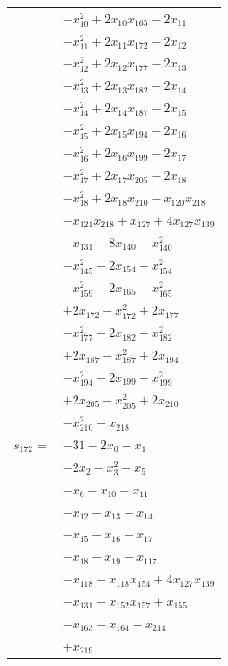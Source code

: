 \begin{longtable}{@{}r@{\;}l@{}}
 & \(\displaystyle -x_{10}^{2} +2x_{10}x_{165} -2x_{11}\) \\
 & \(\displaystyle -x_{11}^{2} +2x_{11}x_{172} -2x_{12}\) \\
 & \(\displaystyle -x_{12}^{2} +2x_{12}x_{177} -2x_{13}\) \\
 & \(\displaystyle -x_{13}^{2} +2x_{13}x_{182} -2x_{14}\) \\
 & \(\displaystyle -x_{14}^{2} +2x_{14}x_{187} -2x_{15}\) \\
 & \(\displaystyle -x_{15}^{2} +2x_{15}x_{194} -2x_{16}\) \\
 & \(\displaystyle -x_{16}^{2} +2x_{16}x_{199} -2x_{17}\) \\
 & \(\displaystyle -x_{17}^{2} +2x_{17}x_{205} -2x_{18}\) \\
 & \(\displaystyle -x_{18}^{2} +2x_{18}x_{210} -x_{120}x_{218}\) \\
 & \(\displaystyle -x_{121}x_{218} +x_{127} +4x_{127}x_{139}\) \\
 & \(\displaystyle -x_{131} +8x_{140} -x_{140}^{2}\) \\
 & \(\displaystyle -x_{145}^{2} +2x_{154} -x_{154}^{2}\) \\
 & \(\displaystyle -x_{159}^{2} +2x_{165} -x_{165}^{2}\) \\
 & \(\displaystyle +2x_{172} -x_{172}^{2} +2x_{177}\) \\
 & \(\displaystyle -x_{177}^{2} +2x_{182} -x_{182}^{2}\) \\
 & \(\displaystyle +2x_{187} -x_{187}^{2} +2x_{194}\) \\
 & \(\displaystyle -x_{194}^{2} +2x_{199} -x_{199}^{2}\) \\
 & \(\displaystyle +2x_{205} -x_{205}^{2} +2x_{210}\) \\
 & \(\displaystyle -x_{210}^{2} +x_{218}\) \\[3pt]
\(s_{172}=\) & \(\displaystyle -31 -2x_{0} -x_{1}\) \\
 & \(\displaystyle -2x_{2} -x_{3}^{2} -x_{5}\) \\
 & \(\displaystyle -x_{6} -x_{10} -x_{11}\) \\
 & \(\displaystyle -x_{12} -x_{13} -x_{14}\) \\
 & \(\displaystyle -x_{15} -x_{16} -x_{17}\) \\
 & \(\displaystyle -x_{18} -x_{19} -x_{117}\) \\
 & \(\displaystyle -x_{118} -x_{118}x_{154} +4x_{127}x_{139}\) \\
 & \(\displaystyle -x_{131} +x_{152}x_{157} +x_{155}\) \\
 & \(\displaystyle -x_{163} -x_{164} -x_{214}\) \\
 & \(\displaystyle +x_{219}\) \\[3pt]
\end{longtable}
\endgroup
